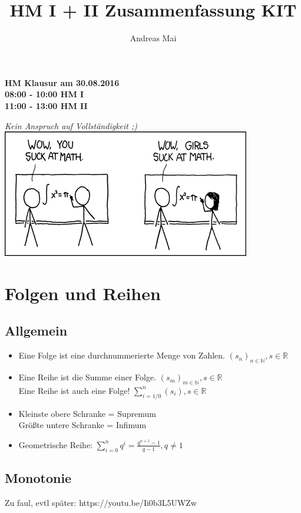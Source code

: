 \documentclass[a4paper,portrait]{scrartcl}
\author{Andreas Mai}
\title{HM I + II Zusammenfassung KIT}
\begin{document}
\maketitle
\begin{center}
\textbf{HM Klausur am 30.08.2016} \\
\textbf{08:00 - 10:00 HM I} \\
\textbf{11:00 - 13:00 HM II} 
\end{center}

\begin{center}
\textit{Kein Anspruch auf Vollständigkeit ;)}
\includegraphics{how_it_works.png}

\end{center}
\clearpage
\tableofcontents
\clearpage
\setcounter{page}{1}
\section{Folgen und Reihen}
\subsection{Allgemein}
\begin{itemize}
	\item Eine Folge ist eine durchnummerierte Menge von Zahlen.  $(s_n)_{n \in \mathbb{N}}, s\in\mathbb{R}$
	\item Eine Reihe ist die Summe einer Folge.  $(s_m)_{m \in \mathbb{N}}, s\in\mathbb{R}$ \\ Eine Reihe ist auch eine Folge! $\sum_{i=1/0}^{n}(s_i),  s\in\mathbb{R}$
	\item Kleinste obere Schranke = Supremum
	\\Größte untere Schranke = Infimum
	\item Geometrische Reihe: $\sum_{i=0}^{n}q^i = \frac{q^{n+1} - 1}{q-1}, q \neq 1$
\end{itemize}
\subsection{Monotonie}
Zu faul, evtl später: https://youtu.be/Ii0b3L5UWZw
\end{document}

